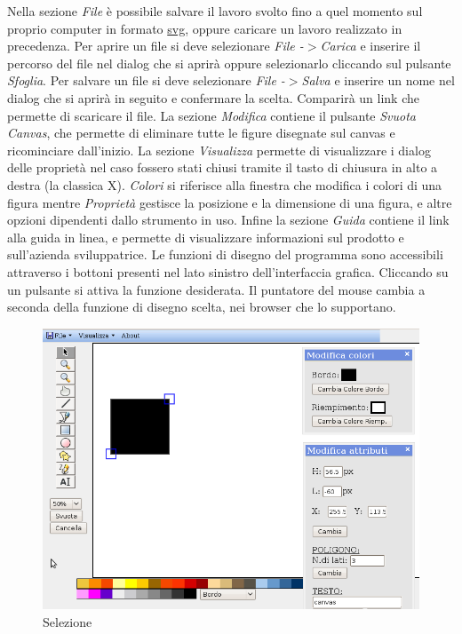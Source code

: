Nella sezione \textit{File} \`e possibile salvare il lavoro svolto fino a quel momento sul proprio computer in formato \underline{svg}, oppure caricare un lavoro realizzato in precedenza.
Per aprire un file si deve selezionare \textit{File -$ > $Carica} e inserire il percorso del file nel dialog che si aprir\`a oppure selezionarlo cliccando sul pulsante \textit{Sfoglia}. 
Per salvare un file si deve selezionare \textit{File -$ > $Salva} e inserire un nome nel dialog che si aprir\`a in seguito e confermare la scelta. Comparir\`a un link che permette di scaricare il file.
La sezione \textit{Modifica} contiene il pulsante \textit{Svuota Canvas}, che permette di eliminare tutte le figure disegnate sul canvas e ricominciare dall'inizio.
La sezione \textit{Visualizza} permette di visualizzare i dialog delle propriet\`a nel caso fossero stati chiusi tramite il tasto di chiusura in alto a destra (la classica X). \textit{Colori} si riferisce alla finestra che modifica i colori di una figura mentre \textit{Propriet\`a} gestisce la posizione e la dimensione di una figura, e altre opzioni dipendenti dallo strumento in uso.
Infine la sezione \textit{Guida} contiene il link alla guida in linea, e permette di visualizzare informazioni sul prodotto e sull'azienda sviluppatrice.
\newpage
{}
Le funzioni di disegno del programma sono accessibili attraverso i bottoni presenti nel lato sinistro dell'interfaccia grafica. Cliccando su un pulsante si attiva la funzione desiderata. Il puntatore del mouse cambia a seconda della funzione di disegno scelta, nei browser che lo supportano.

\begin{figure}[!ht]
\centering
\includegraphics[scale=0.5]{images/selezione.png}
\caption{Selezione}
\end{figure} 

